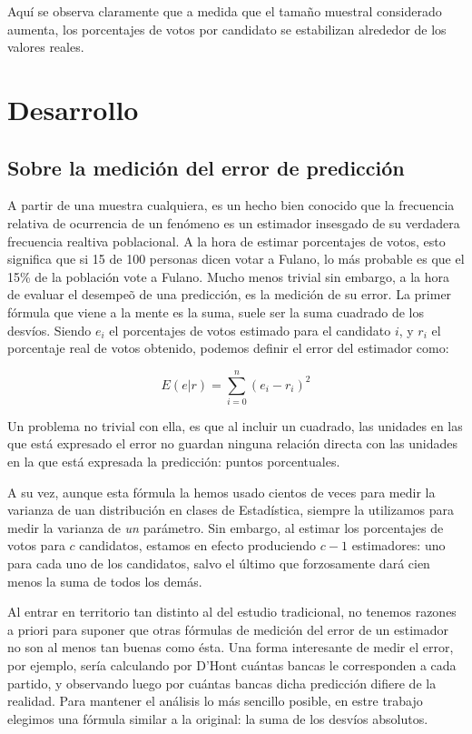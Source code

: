 \documentclass[12pt, a4paper]{article}
\begin{document}
Aqu\'i se observa claramente que a medida que el tama\~no muestral considerado aumenta, los porcentajes de votos por candidato se estabilizan alrededor de los valores reales.

\section{Desarrollo}

\subsection{Sobre la medici\'on del error de predicci\'on}

A partir de una muestra cualquiera, es un hecho bien conocido que la frecuencia relativa de ocurrencia de un fen\'omeno es un estimador insesgado de su verdadera frecuencia realtiva poblacional. A la hora de estimar porcentajes de votos, esto significa que si 15 de 100 personas dicen votar a Fulano, lo m\'as probable es que el 15\% de la poblaci\'on vote a Fulano. Mucho menos trivial sin embargo, a la hora de evaluar el desempe\~o de una predicci\'on, es la medici\'on de su error.
La primer f\'ormula que viene a la mente es la suma, suele ser la suma cuadrado de los desv\'ios. Siendo $e_{i}$ el porcentajes de votos estimado para el candidato $i$, y $r_{i}$ el porcentaje real de votos obtenido, podemos definir el error del estimador como:

$$ E(e|r) = \sum\limits_{i=0}^{n} (e_{i} - r_{i})^2 $$

Un problema no trivial con ella, es que al incluir un cuadrado, las unidades en las que est\'a expresado el error no guardan ninguna relaci\'on directa con las unidades en la que est\'a expresada la predicci\'on: puntos porcentuales.

A su vez, aunque esta f\'ormula la hemos usado cientos de veces para medir la varianza de uan distribuci\'on en clases de Estad\'istica, siempre la utilizamos para medir la varianza de \emph{un} par\'ametro. Sin embargo, al estimar los porcentajes de votos para $c$ candidatos, estamos en efecto produciendo $c-1$ estimadores: uno para cada uno de los candidatos, salvo el \'ultimo que forzosamente dar\'a cien menos la suma de todos los dem\'as.

Al entrar en territorio tan distinto al del estudio tradicional, no tenemos razones a priori para suponer que otras f\'ormulas de medici\'on del error de un estimador no son al menos tan buenas como \'esta. Una forma interesante de medir el error, por ejemplo, ser\'ia calculando por D'Hont cu\'antas bancas le corresponden a cada partido, y observando luego por cu\'antas bancas dicha predicci\'on difiere de la realidad.
Para mantener el an\'alisis lo m\'as sencillo posible, en estre trabajo elegimos una f\'ormula similar a la original: la suma de los desv\'ios absolutos.
\end{document}
